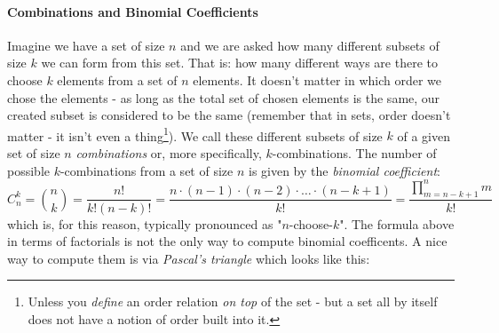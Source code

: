 



\paragraph{Combinations and Binomial Coefficients}
Imagine we have a set of size $n$ and we are asked how many different subsets of size $k$ we can form from this set. That is: how many different ways are there to choose $k$ elements from a set of $n$ elements. It doesn't matter in which order we chose the elements - as long as the total set of chosen elements is the same, our created subset is considered to be the same (remember that in sets, order doesn't matter - it isn't even a thing\footnote{Unless you \emph{define} an order relation \emph{on top} of the set - but a set all by itself does not have a notion of order built into it.}). We call these different subsets of size $k$ of a given set of size $n$ \emph{combinations} or, more specifically, $k$-combinations. The number of possible $k$-combinations from a set of size $n$ is given by the \emph{binomial coefficient}:
\begin{equation}
C_n^k = \binom{n}{k} 
      = \frac{n!}{k! (n-k)!} 
      = \frac{n \cdot (n-1) \cdot (n-2) \cdot \ldots \cdot (n-k+1)}{k!}
      = \frac{\prod_{m=n-k+1}^{n} m}{k!}
\end{equation}
which is, for this reason, typically pronounced as "$n$-choose-$k$". The formula above in terms of factorials is not the only way to compute binomial coefficents. A nice way to compute them is via \emph{Pascal's triangle} which looks like this:

